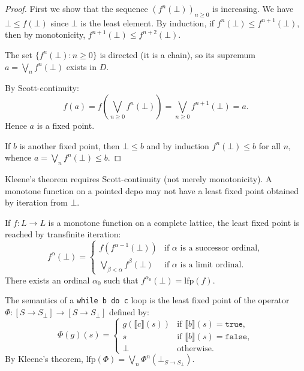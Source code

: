 \begin{proof}
First we show that the sequence $(f^n(\bot))_{n \geq 0}$ is increasing. We have
$\bot \leq f(\bot)$ since $\bot$ is the least element. By induction, if
$f^n(\bot) \leq f^{n+1}(\bot)$, then by monotonicity,
$f^{n+1}(\bot) \leq f^{n+2}(\bot)$.

The set $\{f^n(\bot) : n \geq 0\}$ is directed (it is a chain), so its supremum
$a = \bigvee_n f^n(\bot)$ exists in $D$.

By Scott-continuity:
\[
  f(a) = f\!\left(\bigvee_{n \geq 0} f^n(\bot)\right) = \bigvee_{n \geq 0} f^{n+1}(\bot) = a.
\]
Hence $a$ is a fixed point.

If $b$ is another fixed point, then $\bot \leq b$ and by induction $f^n(\bot) \leq b$
for all $n$, whence $a = \bigvee_n f^n(\bot) \leq b$.
\end{proof}

\begin{attention}
Kleene's theorem requires Scott-continuity (not merely monotonicity). A monotone function
on a pointed dcpo may not have a least fixed point obtained by iteration from $\bot$.
\end{attention}

\begin{corollary}
If $f\colon L \to L$ is a monotone function on a complete lattice, the least fixed point
is reached by transfinite iteration:
\[
  f^\alpha(\bot) = \begin{cases}
    f(f^{\alpha-1}(\bot)) & \text{if } \alpha \text{ is a successor ordinal}, \\
    \bigvee_{\beta < \alpha} f^\beta(\bot) & \text{if } \alpha \text{ is a limit ordinal}.
  \end{cases}
\]
There exists an ordinal $\alpha_0$ such that $f^{\alpha_0}(\bot) = \mathrm{lfp}(f)$.
\end{corollary}

\begin{example}
The semantics of a \texttt{while b do c} loop is the least fixed point of the operator
$\Phi\colon [S \to S_\bot] \to [S \to S_\bot]$ defined by:
\[
  \Phi(g)(s) = \begin{cases}
    g(\llbracket c \rrbracket(s)) & \text{if } \llbracket b \rrbracket(s) = \mathtt{true}, \\
    s & \text{if } \llbracket b \rrbracket(s) = \mathtt{false}, \\
    \bot & \text{otherwise}.
  \end{cases}
\]
By Kleene's theorem, $\mathrm{lfp}(\Phi) = \bigvee_n \Phi^n(\bot_{S \to S_\bot})$.
\end{example}

